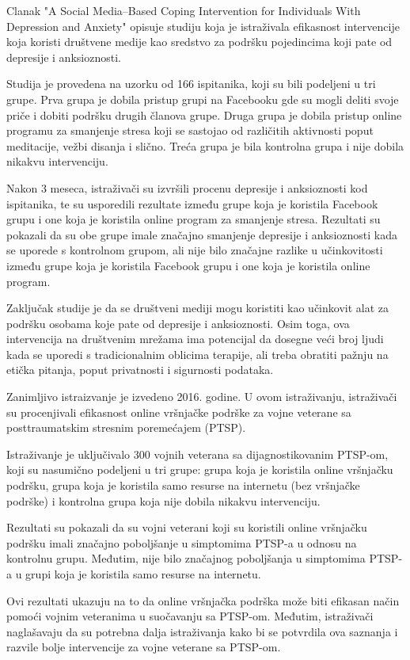 \documentclass[a4paper]{article}
\begin{document}
Clanak "A Social Media–Based Coping Intervention for Individuals With Depression and Anxiety" opisuje studiju koja je istraživala efikasnost intervencije koja koristi društvene medije kao sredstvo za podršku pojedincima koji pate od depresije i anksioznosti.

Studija je provedena na uzorku od 166 ispitanika, koji su bili podeljeni u tri grupe. Prva grupa je dobila pristup grupi na Facebooku gde su mogli deliti svoje priče i dobiti podršku drugih članova grupe. Druga grupa je dobila pristup online programu za smanjenje stresa koji se sastojao od različitih aktivnosti poput meditacije, vežbi disanja i slično. Treća grupa je bila kontrolna grupa i nije dobila nikakvu intervenciju.

Nakon 3 meseca, istraživači su izvršili procenu depresije i anksioznosti kod ispitanika, te su usporedili rezultate između grupe koja je koristila Facebook grupu i one koja je koristila online program za smanjenje stresa. Rezultati su pokazali da su obe grupe imale značajno smanjenje depresije i anksioznosti kada se  uporede s kontrolnom grupom, ali nije bilo značajne razlike u učinkovitosti između grupe koja je koristila Facebook grupu i one koja je koristila online program.

Zaključak studije je da se društveni mediji mogu koristiti kao učinkovit alat za podršku osobama koje pate od depresije i anksioznosti. Osim toga, ova intervencija na društvenim mrežama ima potencijal da dosegne veći broj ljudi kada se uporedi s tradicionalnim oblicima terapije, ali treba obratiti pažnju na etička pitanja, poput privatnosti i sigurnosti podataka.

Zanimljivo istraizvanje je izvedeno 2016. godine. U ovom istraživanju, istraživači su procenjivali efikasnost online vršnjačke podrške za vojne veterane sa posttraumatskim stresnim poremećajem (PTSP).

Istraživanje je uključivalo 300 vojnih veterana sa dijagnostikovanim PTSP-om, koji su nasumično podeljeni u tri grupe: grupa koja je koristila online vršnjačku podršku, grupa koja je koristila samo resurse na internetu (bez vršnjačke podrške) i kontrolna grupa koja nije dobila nikakvu intervenciju.

Rezultati su pokazali da su vojni veterani koji su koristili online vršnjačku podršku imali značajno poboljšanje u simptomima PTSP-a u odnosu na kontrolnu grupu. Međutim, nije bilo značajnog poboljšanja u simptomima PTSP-a u grupi koja je koristila samo resurse na internetu.

Ovi rezultati ukazuju na to da online vršnjačka podrška može biti efikasan način pomoći vojnim veteranima u suočavanju sa PTSP-om. Međutim, istraživači naglašavaju da su potrebna dalja istraživanja kako bi se potvrdila ova saznanja i razvile bolje intervencije za vojne veterane sa PTSP-om.
\end{document}
